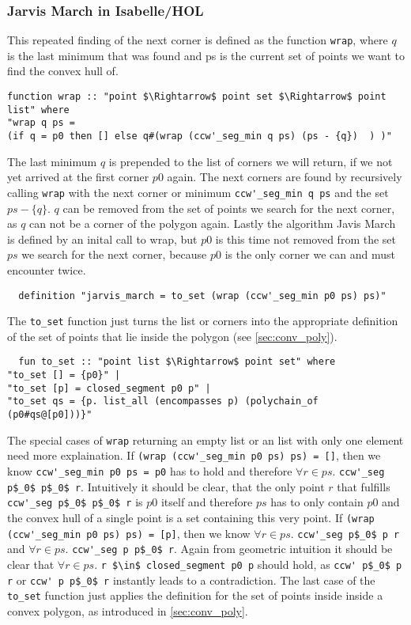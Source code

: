 \subsubsection{Jarvis March in Isabelle/HOL}
This repeated finding of the next corner is defined as the function \lstinline|wrap|, where
$q$ is the last minimum that was found and ps is the current set of points we want to find
the convex hull of.
\begin{lstlisting}
function wrap :: "point $\Rightarrow$ point set $\Rightarrow$ point list" where
"wrap q ps =  
(if q = p0 then [] else q#(wrap (ccw'_seg_min q ps) (ps - {q})  ) )"
\end{lstlisting}
The last minimum $q$ is prepended to the list of corners we will return, if we not yet arrived
at the first corner $p0$ again. The next corners are found by  recursively calling \lstinline|wrap|
with the next corner or minimum \lstinline|ccw'_seg_min q ps| and the set $ps - \{q\}$. $q$ can be
removed from the set of points we search for the next corner, as $q$ can not be a corner
of the polygon again.
Lastly the algorithm Javis March is defined by an inital call to wrap, but $p0$ is this time
not removed from the set $ps$ we search for the next corner, because $p0$ is the only corner we
can and must encounter twice.
\begin{lstlisting}
  definition "jarvis_march = to_set (wrap (ccw'_seg_min p0 ps) ps)"
\end{lstlisting}  
The \lstinline|to_set| function just turns the list or corners into the appropriate 
definition of the set of points that lie inside the polygon (see \ref{sec:conv_poly}).  
\begin{lstlisting}
  fun to_set :: "point list $\Rightarrow$ point set" where
"to_set [] = {p0}" |
"to_set [p] = closed_segment p0 p" |
"to_set qs = {p. list_all (encompasses p) (polychain_of (p0#qs@[p0]))}" 
\end{lstlisting}
The special cases of \lstinline|wrap| returning an empty list or an list with only one element
need more explaination. If \lstinline|(wrap (ccw'_seg_min p0 ps) ps) = []|, then we know
\lstinline|ccw'_seg_min p0 ps = p0| has to hold and therefore $\forall r \in ps.$ \lstinline|ccw'_seg p$_0$ p$_0$ r|.
Intuitively it should be clear, that the only point $r$ that fulfills \lstinline|ccw'_seg p$_0$ p$_0$ r| is $p0$ itself
and therefore $ps$ has to only contain $p0$ and the convex hull of a single point is a set containing this
very point. If \lstinline|(wrap (ccw'_seg_min p0 ps) ps) = [p]|, then we know 
$\forall r \in ps.$ \lstinline|ccw'_seg p$_0$ p r| and $\forall r \in ps.$ \lstinline|ccw'_seg p p$_0$ r|.
Again from geometric intuition it should be clear that  $\forall r \in ps.$ \lstinline|r $\in$ closed_segment p0 p|
should hold, as \lstinline|ccw' p$_0$ p r| or \lstinline|ccw' p p$_0$ r| instantly leads to a contradiction.
The last case of the \lstinline|to_set| function just applies the definition for the 
set of points inside inside a convex polygon, as introduced in \ref*{sec:conv_poly}. 
